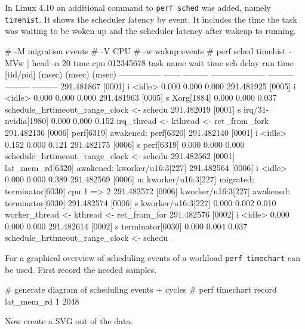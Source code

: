 In Linux 4.10 an additional command to {\tt perf sched} was added, namely
{\tt timehist}. It shows the scheduler latency by event. It includes the
time the task was waiting to be woken up and the scheduler latency
after wakeup to running.

\starttyping
# -M migration events
# -V CPU
# -w wakup events
# perf sched timehist -MVw | head -n 20
           time    cpu  012345678  task name            wait time  sch delay   run time
                                   [tid/pid]               (msec)     (msec)     (msec)
--------------- ------  ---------  -------------------- ---------  ---------  ---------
     291.481867 [0001]   i         <idle>                   0.000      0.000      0.000
     291.481925 [0005]       i     <idle>                   0.000      0.000      0.000
     291.481963 [0005]       s     Xorg[1884]               0.000      0.000      0.037 schedule_hrtimeout_range_clock <- schedu
     291.482019 [0001]   s         irq/31-nvidia[1980]      0.000      0.000      0.152 irq_thread <- kthread <- ret_from_fork
     291.482136 [0006]             perf[6319]                                           awakened: perf[6320]
     291.482140 [0001]   i         <idle>                   0.152      0.000      0.121
     291.482175 [0006]        s    perf[6319]               0.000      0.000      0.000 schedule_hrtimeout_range_clock <- schedu
     291.482562 [0001]             lat_mem_rd[6320]                                     awakened: kworker/u16:3[227]
     291.482564 [0006]        i    <idle>                   0.000      0.000      0.389
     291.482569 [0006]         m     kworker/u16:3[227]                                 migrated: terminator[6030] cpu 1 => 2
     291.482572 [0006]             kworker/u16:3[227]                                   awakened: terminator[6030]
     291.482574 [0006]        s    kworker/u16:3[227]       0.000      0.002      0.010 worker_thread <- kthread <- ret_from_for
     291.482576 [0002]    i        <idle>                   0.000      0.000      0.000
     291.482614 [0002]    s        terminator[6030]         0.000      0.004      0.037 schedule_hrtimeout_range_clock <- schedu
\stoptyping

For a graphical overview of scheduling events of a workload {\tt perf timechart} can
be used. First record the needed samples.

\starttyping
# generate diagram of scheduling events + cycles
# perf timechart record  lat_mem_rd 1 2048
\stoptyping

Now create a SVG out of the data.

